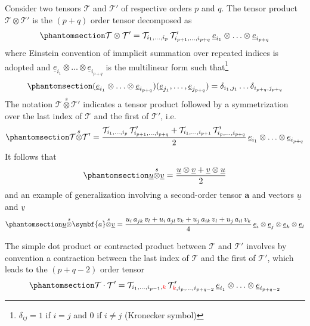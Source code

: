 \documentclass[
  a4paper,
  numbers=noendperiod,
  DIV=12]{scrreprt}
\newcommand{\uu}[1]{{\symbf{{#1}}}}
\newcommand{\uv}[1]{{\underline{{#1}}}}
\newcommand{\ve}[1]{{\uv{{e}}_{{#1}}}}
\newcommand{\sotimes}{{\stackrel{s}{\otimes}}}
\begin{document}
Consider two tensors \(\mathcal{T}\) and \(\mathcal{T}'\) of respective
orders \(p\) and \(q\). The tensor product
\(\mathcal{T}\otimes\mathcal{T}'\) is the \((p+q)\) order tensor
decomposed as \begin{equation}\phantomsection\label{eq-otimes}{
\mathcal{T}\otimes\mathcal{T}'=\mathcal{T}_{i_1,\ldots,i_p} \,\mathcal{T}'_{i_{p+1},\ldots,i_{p+q}}\,
\ve{i_1}\otimes\ldots\otimes\ve{i_{p+q}}
}\end{equation} where Einstein convention of immplicit summation over
repeated indices is adopted and
\(\ve{i_1}\otimes\ldots\otimes\ve{i_{p+q}}\) is the multilinear form
such that\footnote{\(\delta_{ij}=1\) if \(i=j\) and \(0\) if \(i\neq j\)
  (Kronecker symbol)} \begin{equation}\phantomsection\label{eq-multfom}{
(\ve{i_1}\otimes\ldots\otimes\ve{i_{p+q}})(\ve{j_1},\ldots,\ve{j_{p+q}})
=
\delta_{i_1,j_1}\ldots \delta_{i_{p+q},j_{p+q}}
}\end{equation} The notation \(\mathcal{T}\sotimes\mathcal{T}'\)
indicates a tensor product followed by a symmetrization over the last
index of \(\mathcal{T}\) and the first of \(\mathcal{T}'\), i.e.
\begin{equation}\phantomsection\label{eq-sotimes}{
\mathcal{T}\sotimes\mathcal{T}'=
\frac{\mathcal{T}_{i_1,\ldots,i_p} \,\mathcal{T}'_{i_{p+1},\ldots,i_{p+q}}
+
\mathcal{T}_{i_1,\ldots,i_{p+1}} \,\mathcal{T}'_{i_p,\ldots,i_{p+q}}
}{2}
\,\ve{i_1}\otimes\ldots\otimes\ve{i_{p+q}}
}\end{equation} It follows that
\begin{equation}\phantomsection\label{eq-sotimesuv}{
\uv{u}\sotimes\uv{v}=\frac{\uv{u}\otimes\uv{v}+\uv{v}\otimes\uv{u}}{2}
}\end{equation} and an example of generalization involving a
second-order tensor \(\uu{a}\) and vectors \(\uv{u}\) and \(\uv{v}\)
\begin{equation}\phantomsection\label{eq-sotimesuav}{
\uv{u}\sotimes\uu{a}\sotimes\uv{v}=
\frac{u_i\,a_{jk}\,v_l+u_i\,a_{jl}\,v_k+u_j\,a_{ik}\,v_l+u_j\,a_{il}\,v_k}{4}
\,\ve{i}\otimes\ve{j}\otimes\ve{k}\otimes\ve{l}
}\end{equation}

The simple dot product or contracted product between \(\mathcal{T}\) and
\(\mathcal{T}'\) involves by convention a contraction between the last
index of \(\mathcal{T}\) and the first of \(\mathcal{T}'\), which leads
to the \((p+q-2)\) order tensor
\begin{equation}\phantomsection\label{eq-simpledot}{
\mathcal{T}\cdot\mathcal{T}'=\mathcal{T}_{i_1,\ldots,i_{p-1},{\color{red}k}} \,\mathcal{T}'_{{\color{red}k},i_{p},\ldots,i_{p+q-2}}\,
\ve{i_1}\otimes\ldots\otimes\ve{i_{p+q-2}}
}\end{equation}
\end{document}
